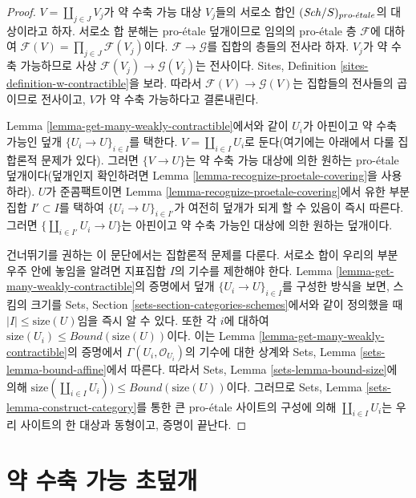\begin{proof}
$V = \coprod_{j \in J} V_j$가 약 수축 가능 대상 $V_j$들의 서로소 합인
$(\mathit{Sch}/S)_{pro\text{-}\acute{e}tale}$의 대상이라고 하자. 서로소 합 분해는 pro-\'etale
덮개이므로 임의의 pro-\'etale 층 $\mathcal{F}$에 대하여
$\mathcal{F}(V) = \prod_{j \in J} \mathcal{F}(V_j)$이다.
$\mathcal{F} \to \mathcal{G}$를 집합의 층들의 전사라 하자.
$V_j$가 약 수축 가능하므로 사상
$\mathcal{F}(V_j) \to \mathcal{G}(V_j)$는 전사이다. Sites, Definition
\ref{sites-definition-w-contractible}을 보라. 따라서
$\mathcal{F}(V) \to \mathcal{G}(V)$는 집합들의 전사들의 곱이므로
전사이고, $V$가 약 수축 가능하다고 결론내린다.

\medskip\noindent
Lemma \ref{lemma-get-many-weakly-contractible}에서와 같이 $U_i$가
아핀이고 약 수축 가능인 덮개
$\{U_i \to U\}_{i \in I}$를 택한다.
$V = \coprod_{i \in I} U_i$로 둔다(여기에는 아래에서 다룰 집합론적
문제가 있다). 그러면 $\{V \to U\}$는 약 수축 가능 대상에 의한 원하는
pro-\'etale 덮개이다(덮개인지 확인하려면 Lemma
\ref{lemma-recognize-proetale-covering}을 사용하라).
$U$가 준콤팩트이면 Lemma \ref{lemma-recognize-proetale-covering}에서
유한 부분집합 $I' \subset I$를 택하여
$\{U_i \to U\}_{i \in I'}$가 여전히 덮개가 되게 할 수 있음이 즉시
따른다. 그러면 $\{\coprod_{i \in I'} U_i \to U\}$는 아핀이고 약 수축
가능인 대상에 의한 원하는 덮개이다.

\medskip\noindent
건너뛰기를 권하는 이 문단에서는 집합론적 문제를 다룬다.
서로소 합이 우리의 부분 우주 안에 놓임을 알려면 지표집합 $I$의
기수를 제한해야 한다. Lemma \ref{lemma-get-many-weakly-contractible}의
증명에서 덮개 $\{U_i \to U\}_{i \in I}$를 구성한 방식을 보면,
스킴의 크기를 Sets, Section \ref{sets-section-categories-schemes}에서와
같이 정의했을 때 $|I| \leq \text{size}(U)$임을 즉시 알 수 있다.
또한 각 $i$에 대하여
$\text{size}(U_i) \leq Bound(\text{size}(U))$이다. 이는 Lemma
\ref{lemma-get-many-weakly-contractible}의 증명에서
$\Gamma(U_i, \mathcal{O}_{U_i})$의 기수에 대한 상계와 Sets, Lemma
\ref{sets-lemma-bound-affine}에서 따른다. 따라서 Sets, Lemma
\ref{sets-lemma-bound-size}에 의해
$\text{size}(\coprod_{i \in I} U_i)) \leq Bound(\text{size}(U))$이다.
그러므로 Sets, Lemma \ref{sets-lemma-construct-category}를 통한 큰
pro-\'etale 사이트의 구성에 의해 $\coprod_{i \in I} U_i$는 우리
사이트의 한 대상과 동형이고, 증명이 끝난다.
\end{proof}






\section{약 수축 가능 초덮개}
\label{section-hypercovering}

